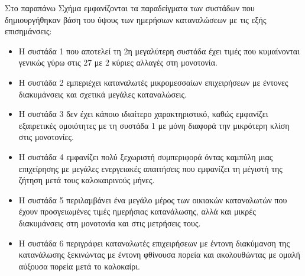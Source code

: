 Στο παραπάνω Σχήμα εμφανίζονται τα παραδείγματα των συστάδων που δημιουργήθηκαν βάση του ύψους των ημερήσιων καταναλώσεων με τις εξής επισημάνσεις:
\begin{itemize}
\item Η συστάδα 1 που αποτελεί τη 2η μεγαλύτερη συστάδα έχει τιμές που κυμαίνονται γενικώς γύρω στις 27  με 2 κύριες αλλαγές στη μονοτονία.
\item Η συστάδα 2 εμπεριέχει καταναλωτές μικρομεσσαίων επιχειρήσεων με έντονες διακυμάνσεις και σχετικά μεγάλες καταναλώσεις.
\item Η συστάδα 3 δεν έχει κάποιο ιδιαίτερο χαρακτηριστικό, καθώς εμφανίζει εξαιρετικές ομοιότητες με τη συστάδα 1 με μόνη διαφορά την μικρότερη κλίση στις μονοτονίες.
\item Η συστάδα 4 εμφανίζει πολύ ξεχωριστή συμπεριφορά όντας καμπύλη μιας επιχείρησης με μεγάλες ενεργειακές απαιτήσεις που εμφανίζει τη μέγιστή της ζήτηση μετά τους καλοκαιρινούς μήνες. 
\item Η συστάδα 5 περιλαμβάνει ένα μεγάλο μέρος των οικιακών καταναλωτών που έχουν προσγειωμένες τιμές ημερήσιας κατανάλωσης, αλλά και μικρές διακυμάνσεις στη μονοτονία και στις μετρήσεις τους.
\item Η συστάδα 6 περιγράφει καταναλωτές επιχειρήσεων με έντονη διακύμανση της κατανάλωσης ξεκινώντας με έντονη φθίνουσα πορεία και ακολουθώντας με ομαλή αύξουσα πορεία μετά το καλοκαίρι.
\end{itemize}

